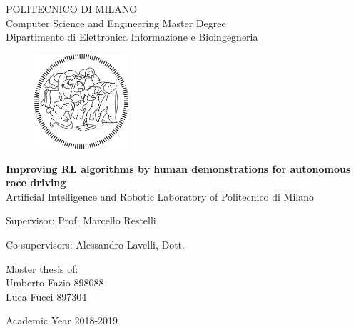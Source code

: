 \thispagestyle{empty}
\vspace*{-1.5cm}
 \bfseries{
\begin{center}
  \large
  POLITECNICO DI MILANO\\
  \normalsize
  Computer Science and Engineering Master Degree\\
  Dipartimento di Elettronica Informazione e Bioingegneria\\
  \begin{figure}[htbp]
    \begin{center}
      \includegraphics[width=3.5cm]{./img/logo/logo poli}
    \end{center}
  \end{figure}
  \vspace*{0.1cm} \LARGE


  \textbf{Improving RL algorithms by human demonstrations for autonomous race driving}\\


  \vspace*{.75truecm} \large
  Artificial Intelligence and Robotic Laboratory \newline of Politecnico di Milano
\end{center}
\vspace*{2.0cm} \large
\begin{flushleft}


  Supervisor: Prof. Marcello Restelli \\

  \begin{tabbing}  
      Co-supervisors: Alessandro Lavelli, Dott.

  \end{tabbing}
\end{flushleft}
\vspace*{1.0cm}
\begin{flushright}


  Master thesis of:\\ Umberto Fazio 898088\\  Luca Fucci 897304\\
 				    


\end{flushright}
\vspace*{0.8cm}
\begin{center}

  Academic Year 2018-2019
\end{center} \clearpage
}
